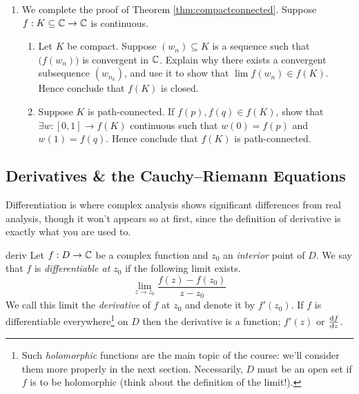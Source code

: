 \begin{exercises*}{}{}
\begin{enumerate}
	  
	  \item We complete the proof of Theorem \ref{thm:compactconnected}. Suppose $f:K\subseteq\C\to\C$ is continuous.
	  \begin{enumerate}
	    \item Let $K$ be compact. Suppose $(w_n)\subseteq K$ is a sequence such that $\bigl(f(w_n)\bigr)$ is convergent in $\C$. Explain why there exists a convergent subsequence $(w_{n_k})$, and use it to show that $\lim f(w_n)\in f(K)$. Hence conclude that $f(K)$ is closed.
			\item Suppose $K$ is path-connected. If $f(p),f(q)\in f(K)$, show that $\exists w:[0,1]\to f(K)$ continuous such that $w(0)=f(p)$ and $w(1)=f(q)$. Hence conclude that $f(K)$ is path-connected.
	  \end{enumerate}
	\end{enumerate}
\end{exercises*}

\clearpage


\subsection{Derivatives \& the Cauchy--Riemann Equations}%

Differentiation is where complex analysis shows significant differences from real analysis, though it won't appears so at first, since the definition of derivative is exactly what you are used to.

\begin{defn}{}{deriv}
Let $f:D\to\C$ be a complex function and $z_0$ an \emph{interior} point of $D$. We say that $f$ is \emph{differentiable at $z_0$} if the following limit exists.
\[\lim_{z\to z_0}\frac{f(z)-f(z_0)}{z-z_0}\]
We call this limit the \emph{derivative} of $f$ at $z_0$ and denote it by $f'(z_0)$. If $f$ is differentiable everywhere\footnote{Such \emph{holomorphic} functions are the main topic of the course: we'll consider them more properly in the next section. Necessarily, $D$ must be an open set if $f$ is to be holomorphic (think about the definition of the limit!).} on $D$ then the derivative is a function; $f'(z)$ or $\diff[f]{z}$. 
\end{defn}

